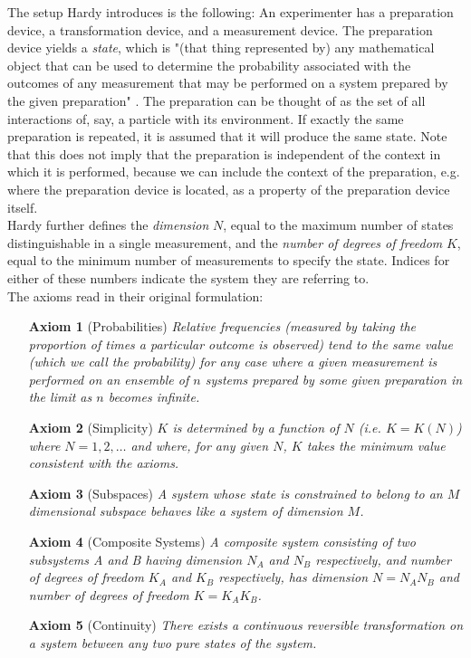 \documentclass[11pt, a4paper]{article}
\begin{document}
The setup Hardy introduces is the following: An experimenter has a preparation device, a transformation device, and a measurement device. The preparation device yields a \emph{state}, which is "(that thing represented by) any mathematical object that can be used to determine the probability associated with the outcomes of any measurement that may be performed on a system prepared by the given preparation" \cite{hardy2001quantum}. The preparation can be thought of as the set of all interactions of, say, a particle with its environment. If exactly the same preparation is repeated, it is assumed that it will produce the same state. Note that this does not imply that the preparation is independent of the context in which it is performed, because we can include the context of the preparation, e.g. where the preparation device is located, as a property of the preparation device itself.\\
Hardy further defines the \emph{dimension} $N$, equal to the maximum number of states distinguishable in a single measurement, and the \emph{number of degrees of freedom} $K$, equal to the minimum number of measurements to specify the state. Indices for either of these numbers indicate the system they are referring to. \\
The axioms read in their original formulation:
\begin{itemize}
\setlength{\itemindent}{3em}
\item[\textbf{Axiom 1}] (Probabilities) \emph{Relative frequencies (measured by taking the proportion of times a particular outcome is observed) tend to the same value (which we call the probability) for any case where a given measurement is performed on an ensemble of $n$ systems prepared by some given preparation in the limit as $n$ becomes infinite.}
\item[\textbf{Axiom 2}] (Simplicity) \emph{$K$ is determined by a function of $N$ (i.e. $K = K(N)$)  where $N=1,2,\ldots$ and where, for any given $N$, $K$ takes the minimum value consistent with the axioms.}
\item[\textbf{Axiom 3}] (Subspaces) \emph{A system whose state is constrained to belong to an $M$ dimensional subspace behaves like a system of dimension $M$.}
\item[\textbf{Axiom 4}] (Composite Systems) \emph{A composite system consisting of two subsystems A and B having dimension $N_A$ and $N_B$ respectively, and number of degrees of freedom $K_A$ and $K_B$ respectively, has dimension $N = N_AN_B$ and number of degrees of freedom $K = K_AK_B$.}
\item[\textbf{Axiom 5}] (Continuity) \emph{There exists a continuous reversible transformation on a system between any two pure states of the system.}
\end{itemize}
\end{document}
